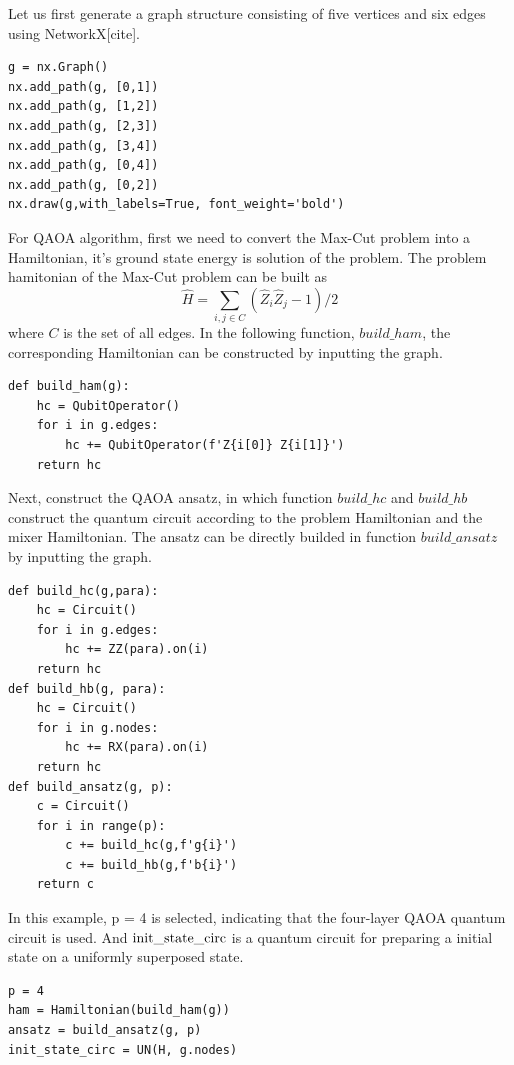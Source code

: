 Let us first generate a graph structure consisting of five vertices and six edges using NetworkX[cite].
\begin{lstlisting}
g = nx.Graph()
nx.add_path(g, [0,1])
nx.add_path(g, [1,2])
nx.add_path(g, [2,3])
nx.add_path(g, [3,4])
nx.add_path(g, [0,4])
nx.add_path(g, [0,2])
nx.draw(g,with_labels=True, font_weight='bold')
\end{lstlisting}
 
For QAOA algorithm, first we need to convert the Max-Cut problem into a Hamiltonian, it's ground state energy is solution of the problem. The problem hamitonian of the Max-Cut problem can be built as 
\begin{equation}
\hat{H} = \sum_{i,j\in C}(\hat{Z}_i\hat{Z}_j-1)/2
\end{equation}
where $C$ is the set of all edges. In the following function, ${ build \_ ham}$, the corresponding Hamiltonian can be constructed by inputting the graph.
\begin{lstlisting}
def build_ham(g):
    hc = QubitOperator()
    for i in g.edges:
        hc += QubitOperator(f'Z{i[0]} Z{i[1]}')
    return hc
\end{lstlisting}
Next, construct the QAOA ansatz, in which function $build\_hc$ and $build\_hb$ construct the quantum circuit according to the problem Hamiltonian and the mixer Hamiltonian. The ansatz can be directly builded in function $build\_ansatz$ by inputting the graph.

\begin{lstlisting}
def build_hc(g,para):
    hc = Circuit()
    for i in g.edges:
        hc += ZZ(para).on(i)
    return hc
def build_hb(g, para):
    hc = Circuit()
    for i in g.nodes:
        hc += RX(para).on(i)
    return hc
def build_ansatz(g, p):
    c = Circuit()
    for i in range(p):
        c += build_hc(g,f'g{i}')
        c += build_hb(g,f'b{i}')
    return c
\end{lstlisting}

In this example, p = 4 is selected, indicating that the four-layer QAOA quantum circuit is used.  And ${\rm init\_state\_circ}$ is a quantum circuit for preparing a initial state on a uniformly superposed state.
\begin{lstlisting}
p = 4
ham = Hamiltonian(build_ham(g))
ansatz = build_ansatz(g, p)
init_state_circ = UN(H, g.nodes)
\end{lstlisting}


